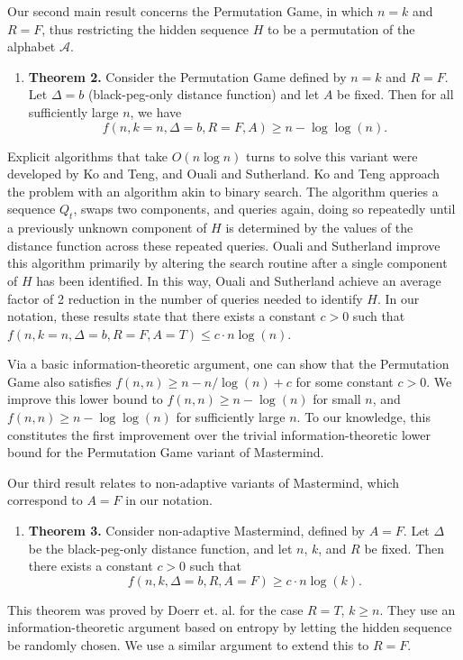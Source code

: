 \documentclass[12pt, a4paper]{article}
\begin{document}
Our second main result concerns the Permutation Game, in which $n=k$ and $R=F$, thus restricting the hidden sequence $H$ to be a permutation of the alphabet $\mathcal{A}$.
\begin{enumerate}[label=]
	\item\textbf{Theorem 2.} Consider the Permutation Game defined by $n = k$ and $R = F$. Let $\Delta = b$ (black-peg-only distance function) and let $A$ be fixed. Then for all sufficiently large $n$, we have
	\begin{equation*}
		f(n, k = n, \Delta = b, R = F, A) \ge n - \log\log(n).
	\end{equation*}
\end{enumerate}
Explicit algorithms that take $O(n \log n)$ turns to solve this variant were developed by Ko and Teng\cite{KT86}, and Ouali and Sutherland\cite{OS13}. Ko and Teng approach the problem with an algorithm akin to binary search. The algorithm queries a sequence $Q_t$, swaps two components, and queries again, doing so repeatedly until a previously unknown component of $H$ is determined by the values of the distance function across these repeated queries. Ouali and Sutherland improve this algorithm primarily by altering the search routine after a single component of $H$ has been identified. In this way, Ouali and Sutherland achieve an average factor of 2 reduction in the number of queries needed to identify $H$. In our notation, these results state that there exists a constant $c>0$ such that $f(n, k=n, \Delta=b, R = F, A = T)\le c\cdot n\log(n)$.

Via a basic information-theoretic argument, one can show that the Permutation Game also satisfies $f(n, n)\ge n - n/\log(n) + c$ for some constant $c>0$. We improve this lower bound to $f(n, n)\ge n - \log(n)$ for small $n$, and $f(n, n)\ge n- \log \log(n)$ for sufficiently large $n$. To our knowledge, this constitutes the first improvement over the trivial information-theoretic lower bound for the Permutation Game variant of Mastermind.

Our third result relates to non-adaptive variants of Mastermind, which correspond to $A=F$ in our notation.
\begin{enumerate}[label=]
	\item\textbf{Theorem 3.} Consider non-adaptive Mastermind, defined by $A=F$. Let $\Delta$ be the black-peg-only distance function, and let $n$, $k$, and $R$ be fixed. Then there exists a constant $c>0$ such that
	\begin{equation*}
		f(n, k, \Delta = b, R, A=F)\ge c\cdot n\log(k).
	\end{equation*}
\end{enumerate}
This theorem was proved by Doerr et. al.\cite{DS13} for the case $R = T$, $k \ge n$. They use an information-theoretic argument based on entropy by letting the hidden sequence be randomly chosen. 
 We use a similar argument to extend this to $R = F$. 
\end{document}

